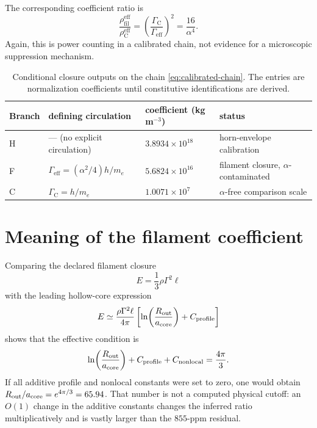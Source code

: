 \documentclass[aps,pre,preprint,notitlepage,nofootinbib,superscriptaddress]{revtex4-2}
\newcommand{\rhofil}{\rho_{\mathrm{fil}}^{\mathrm{eff}}}
\newcommand{\rhoCeff}{\rho_{\mathrm C}^{\mathrm{eff}}}
\newcommand{\Gammaeff}{\Gamma_{\mathrm{eff}}}
\newcommand{\GammaC}{\Gamma_{\mathrm C}}
\begin{document}
The corresponding coefficient ratio is
\begin{equation}
  \frac{\rhofil}{\rhoCeff}
  =
  \left(\frac{\GammaC}{\Gammaeff}\right)^2
  =
  \frac{16}{\alpha^4}.
  \label{eq:rho-ratio-gamma}
\end{equation}
Again, this is power counting in a calibrated chain, not evidence for a microscopic suppression mechanism.

\begin{table}[t]
\caption{Conditional closure outputs on the chain \cref{eq:calibrated-chain}.  The entries are normalization coefficients until constitutive identifications are derived.}
\label{tab:closures}
\begin{ruledtabular}
\begin{tabular}{llll}
Branch & defining circulation & coefficient (kg\,m\(^{-3}\)) & status\\
\hline
H & --- (no explicit circulation) & \(3.8934\times10^{18}\) & horn-envelope calibration\\
F & \(\Gammaeff=(\alpha^2/4)h/m_e\) & \(5.6824\times10^{16}\) & filament closure, \(\alpha\)-contaminated\\
C & \(\GammaC=h/m_e\) & \(1.0071\times10^{7}\) & \(\alpha\)-free comparison scale\\
\end{tabular}
\end{ruledtabular}
\end{table}

\section{Meaning of the filament coefficient}
\label{sec:line-coefficient}

Comparing the declared filament closure
\[
E=\frac13\rho\Gamma^2\ell
\]
with the leading hollow-core expression
\[
E
\simeq
\frac{\rho\Gamma^2\ell}{4\pi}
\left[
\ln\!\left(\frac{R_{\rm out}}{a_{\rm core}}\right)
+C_{\rm profile}
\right]
\]
shows that the effective condition is
\begin{equation}
  \ln\!\left(\frac{R_{\rm out}}{a_{\rm core}}\right)
  +C_{\rm profile}
  +C_{\rm nonlocal}
  =
  \frac{4\pi}{3}.
  \label{eq:effective-log}
\end{equation}
If all additive profile and nonlocal constants were set to zero, one would obtain \(R_{\rm out}/a_{\rm core}=e^{4\pi/3}=65.94\).  That number is not a computed physical cutoff: an \(O(1)\) change in the additive constants changes the inferred ratio multiplicatively and is vastly larger than the \(855\)-ppm residual.
\end{document}
